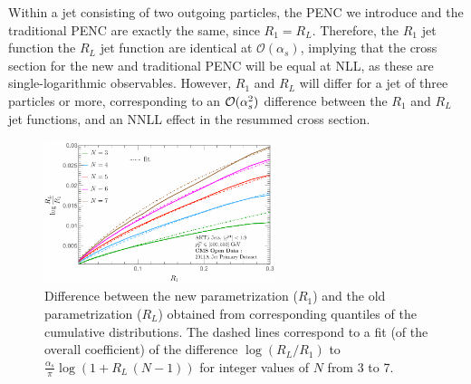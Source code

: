 Within a jet consisting of two outgoing particles, the PENC we introduce and the traditional PENC are exactly the same, since \(R_1 = R_L\).
%
Therefore, the \(R_1\) jet function the \(R_L\) jet function are identical at \(\mathcal{O}(\alpha_s)\),
implying that the cross section for the new and traditional PENC will be equal at NLL, as these are single-logarithmic observables.
%
However, \(R_1\) and \(R_L\) will differ for a jet of three particles or more, corresponding to an ${\cal O}(\alpha_s^2)$ difference between the \(R_1\) and \(R_L\) jet functions, and an NNLL effect in the resummed cross section.


\begin{figure}[h]
    \centering
    	\includegraphics[width=0.6\textwidth]{figures/eec-angles/ENC_quantiles.pdf}
        \caption[
        Comparison of new and traditional projected energy correlators via quantiles of the corresponding cumulative distributions.
        Figure by Ankita Budhraja.
    ]{
        Difference between the new parametrization ($R_1$) and the old parametrization ($R_L$) obtained from corresponding quantiles of the cumulative distributions.
        The dashed lines correspond to a fit (of the overall coefficient) of the difference \( \log(R_L/R_1) \) to $\frac{\alpha_s}{\pi} \log(1+R_L\,(N-1))$ for integer values of $N$ from 3 to 7.
    }
	\label{fig:nll_equiv}%
\end{figure}


